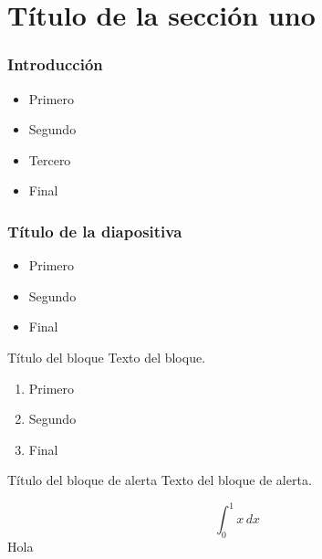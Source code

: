 \section{Título de la sección uno}

\begin{frame}
    \frametitle{Introducción}
    
    \begin{itemize}
        \item Primero
        \item Segundo
        \item Tercero
        \item Final
    \end{itemize}
\end{frame}

\begin{frame}
    \frametitle{Título de la diapositiva}
    
    \begin{itemize}
        \item Primero
        \item Segundo
        \item Final
    \end{itemize}
    
    \begin{block}{Título del bloque}
        Texto del bloque.
    \end{block}
\end{frame}

\begin{frame}
    \begin{enumerate}
        \item Primero
        \item Segundo
        \item Final
    \end{enumerate}
    
    \begin{alertblock}{Título del bloque de alerta}
        Texto del bloque de alerta.
    \end{alertblock}
    \[
        \int_0^1 x\, dx
    \]
    Hola
\end{frame}

